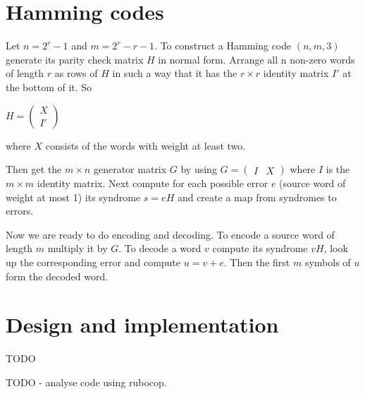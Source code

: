 \documentclass{article}
\begin{document}
\section{Hamming codes}

Let $n=2^r-1$ and $m=2^r-r-1$. To construct a Hamming code $(n, m, 3)$ generate its parity check matrix $H$ in normal form. Arrange all n non-zero words of length $r$ as rows of $H$ in such a way that it has the $r \times r$ identity matrix $I'$ at the bottom of it. So

\begin{center}
$
H =
\begin{pmatrix}
  X \\
  I'
\end{pmatrix}
$
\end{center}
where $X$ consists of the words with weight at least two.


Then get the $m \times n$ generator matrix $G$ by using
$
G =
\begin{pmatrix}
  I & X
\end{pmatrix}
$
where $I$ is the $m \times m$ identity matrix. Next compute for each possible error $e$ (source word of weight at most 1) its syndrome $s=eH$ and create a map from syndromes to errors.

Now we are ready to do encoding and decoding. To encode a source word of length $m$ multiply it by $G$. To decode a word $v$ compute its syndrome $vH$, look up the corresponding error and compute $u=v+e$. Then the first $m$ symbols of $u$ form the decoded word.


\section{Design and implementation}

TODO

TODO - analyse code using rubocop.
\end{document}
